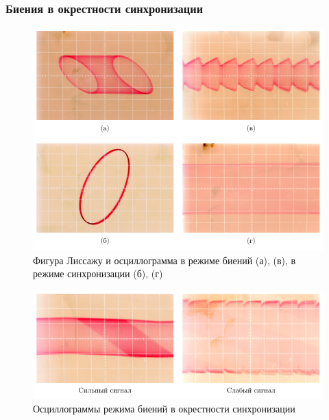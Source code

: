 \documentclass[a4paper,14pt]{extarticle}
\begin{document}
\subsubsection{Биения в окрестности синхронизации}
\begin{figure}[H]
	\centering
	\includegraphics[width=\textwidth]{plot/photo.pdf}
	\vspace{-2em}
	\caption{Фигура Лиссажу и осциллограмма в режиме биений (а), (в),  в режиме синхронизации (б), (г)}
	\label{fig:liss}
\end{figure}


\begin{figure}[H]
	\centering
	\includegraphics[width=\textwidth]{plot/level.pdf}
	\vspace{-2em}
	\caption{Осциллограммы режима биений в окрестности синхронизации}
	\label{fig:bie}
\end{figure}
\end{document}
